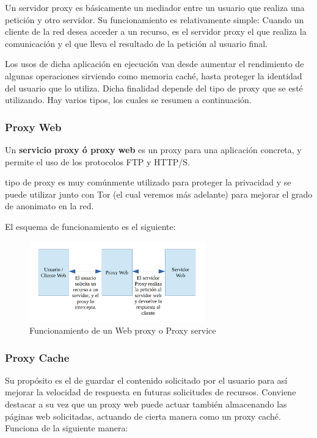 Un servidor proxy es básicamente un mediador entre un usuario que
realiza una petición y otro servidor.  Su funcionamiento es
relativamente simple: Cuando un cliente de la red desea acceder a un
recurso, es el servidor proxy el que realiza la comunicación y el que
lleva el resultado de la petición al usuario final.

Los usos de dicha aplicación en ejecución van desde aumentar el
rendimiento de algunas operaciones sirviendo como memoria caché, hasta
proteger la identidad del usuario que lo utiliza.  Dicha finalidad
depende del tipo de proxy que se esté utilizando.  Hay varios tipos,
los cuales se resumen a continuación.

\subsubsection{Proxy Web}

Un \textbf{servicio proxy ó proxy web} es un proxy para una aplicación concreta, y permite el uso de los protocolos FTP y HTTP/S.

  tipo de proxy es muy comúnmente utilizado para proteger la
privacidad y se puede utilizar junto con Tor (el cual veremos más
adelante) para mejorar el grado de anonimato en la red.

El esquema de funcionamiento es el siguiente:

\begin{figure}[h]
	\centerline{
		\mbox{\includegraphics[width=3.00in]{images/proxy_web.png}}
	}
	\caption{Funcionamiento de un Web proxy o Proxy service}
	\label{fig:norm_Daugman}
\end{figure}

\subsubsection{Proxy Cache}

Su propósito es el de guardar el contenido solicitado por el usuario para así mejorar la velocidad de respuesta en futuras solicitudes de recursos. 
Conviene destacar a su vez que un proxy web puede actuar también almacenando las páginas web solicitadas, actuando de cierta manera como un proxy caché. Funciona de la siguiente manera:

